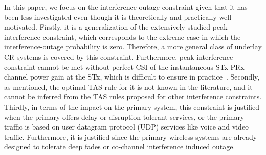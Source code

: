 \documentclass[12pt,draftcls,peerreview,onecolumn]{IEEEtran}
\begin{document}
In this paper, we focus on the interference-outage constraint given that it has been less investigated even though it is theoretically and practically well motivated.  Firstly, it is a generalization of the extensively studied peak interference constraint, which corresponds to the extreme case in which the interference-outage probability is zero. Therefore, a more general class of underlay CR systems is covered by this constraint. Furthermore, peak interference constraint cannot be met without perfect  CSI of the instantaneous STx-PRx channel power gain at the STx, which is difficult to ensure in practice~\cite{musavian_2009_tcom,Suraweera_2010_TVT,Peng_2016_eurasip}. Secondly, as mentioned, the optimal TAS rule for it is not known in the literature, and it cannot be inferred from the TAS rules proposed for other interference constraints. Thirdly, in terms of the impact on the primary system, this constraint is justified when the primary offers delay or disruption tolerant services, or the primary traffic is based on user datagram protocol (UDP) services like voice and video traffic. Furthermore, it is justified since the primary wireless systems are already designed to tolerate deep fades or co-channel interference induced outage. 
\end{document}
